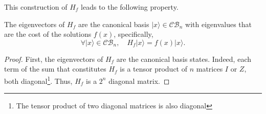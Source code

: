This construction of $H_{f}$ leads to the following property.

\begin{proposition}
    The eigenvectors of $H_{f}$ are the canonical basis $|x\rangle \in \mathcal{C B}_{n}$ with eigenvalues that are the cost of the solutions $f(x)$, specifically,
\begin{equation}
    \forall|x\rangle \in \mathcal{C B}_{n}, \quad H_{f}|x\rangle=f(x)|x\rangle. \tag{21}
\end{equation}
\end{proposition}
\begin{proof}
    First, the eigenvectors of $H_{f}$ are the canonical basis states. Indeed, each term of the sum that constitutes $H_{f}$ is a tensor product of $n$ matrices $I$ or $Z$, both diagonal\footnote{The tensor product of two diagonal matrices is also diagonal}. Thus, $H_{f}$ is a $2^{n}$ diagonal matrix. 


\end{proof}
